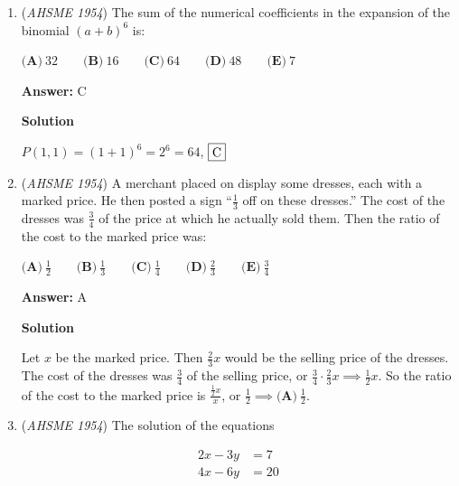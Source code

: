 \begin{enumerate}
 \textbf{Answer: }C



\textbf{Solution}

Using the Secant-Secant Power Theorem, you can get $9(16)=(13-r)(13+r)$, where $r$ is the radius of the given circle. Solving the equation, you get a quadratic: $r^2-25$. A radius cannot be negative so the answer is $\boxed{\textbf{(C) }5"}$



	\item (\textit{AHSME 1954}) The sum of the numerical coefficients in the expansion of the binomial $(a+b)^6$ is: 


 $\textbf{(A)}\ 32 \qquad \textbf{(B)}\ 16 \qquad \textbf{(C)}\ 64 \qquad \textbf{(D)}\ 48 \qquad \textbf{(E)}\ 7$

 \textbf{Answer: }C



\textbf{Solution}

$P(1,1)=(1+1)^6=2^6=64$, $\fbox{C}$



	\item (\textit{AHSME 1954}) A merchant placed on display some dresses, each with a marked price. He then posted a sign “$\frac{1}{3}$ off on these dresses.” 
The cost of the dresses was $\frac{3}{4}$ of the price at which he actually sold them. Then the ratio of the cost to the marked price was: 


 $\textbf{(A)}\ \frac{1}{2} \qquad \textbf{(B)}\ \frac{1}{3} \qquad \textbf{(C)}\ \frac{1}{4} \qquad \textbf{(D)}\ \frac{2}{3}\qquad\textbf{(E)}\ \frac{3}{4}$

 \textbf{Answer: }A



\textbf{Solution}

Let $x$ be the marked price. Then $\frac{2}{3}x$ would be the selling price of the dresses. The cost of the dresses was $\frac{3}{4}$ of the selling price, or $\frac{3}{4}\cdot\frac{2}{3}x \implies \frac{1}{2}x$. So the ratio of the cost to the marked price is $\frac{\frac{1}{2}x}{x}$, or $\frac{1}{2} \implies \boxed{\textbf{(A)}\ \frac{1}{2}}$.

 


	\item (\textit{AHSME 1954}) The solution of the equations 


 
 \begin{align*}2x-3y &=7 \\ 4x-6y &=20\end{align*}




\end{enumerate}
